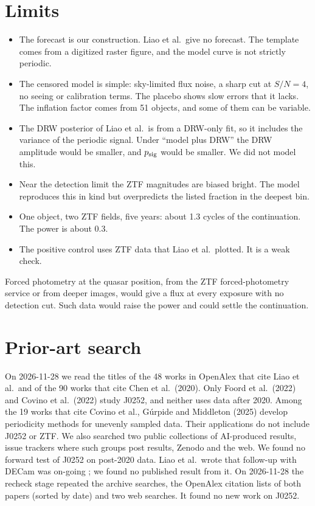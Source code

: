 \documentclass[11pt]{article}
\newcommand{\psig}{p_{\rm sig}}
\begin{document}
\section{Limits}
\begin{itemize}
\item The forecast is our construction. Liao et al.\ give no forecast. The template comes from a digitized raster figure, and the model curve is not strictly periodic.
\item The censored model is simple: sky-limited flux noise, a sharp cut at $S/N = 4$, no seeing or calibration terms. The placebo shows slow errors that it lacks. The inflation factor comes from 51 objects, and some of them can be variable.
\item The DRW posterior of Liao et al.\ is from a DRW-only fit, so it includes the variance of the periodic signal. Under ``model plus DRW'' the DRW amplitude would be smaller, and $\psig$ would be smaller. We did not model this.
\item Near the detection limit the ZTF magnitudes are biased bright. The model reproduces this in kind but overpredicts the listed fraction in the deepest bin.
\item One object, two ZTF fields, five years: about 1.3 cycles of the continuation. The power is about 0.3.
\item The positive control uses ZTF data that Liao et al.\ plotted. It is a weak check.
\end{itemize}
Forced photometry at the quasar position, from the ZTF forced-photometry service or from deeper images, would give a flux at every exposure with no detection cut. Such data would raise the power and could settle the continuation.

\section{Prior-art search}\label{sec:prior}
On 2026-11-28 we read the titles of the 48 works in OpenAlex that cite Liao et al.\ and of the 90 works that cite Chen et al.\ (2020). Only Foord et al.\ (2022) and Covino et al.\ (2022) study J0252, and neither uses data after 2020. Among the 19 works that cite Covino et al., Gúrpide and Middleton (2025) \cite{gurpide2025} develop periodicity methods for unevenly sampled data. Their applications do not include J0252 or ZTF. We also searched two public collections of AI-produced results, issue trackers where such groups post results, Zenodo and the web. We found no forward test of J0252 on post-2020 data. Liao et al.\ wrote that follow-up with DECam was on-going \cite{liao2021}; we found no published result from it. On 2026-11-28 the recheck stage repeated the archive searches, the OpenAlex citation lists of both papers (sorted by date) and two web searches. It found no new work on J0252.
\end{document}
